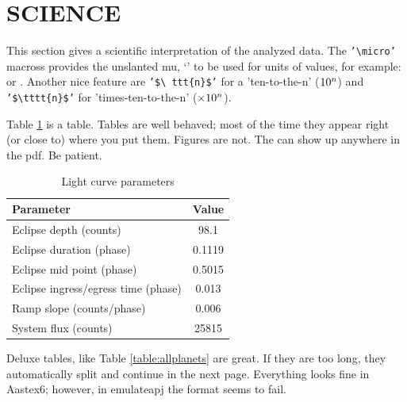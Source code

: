 \section{SCIENCE}
\label{sec:science}

This section gives a scientific interpretation of the analyzed data.
The \texttt{'\textbackslash micro'} macross provides the unslanted mu,
`{\micro}' to be used for units of values, for example: {\micron} or
{\microbar}.  Another nice feature are \texttt{'\$\textbackslash
  ttt\{n\}\$'} for a 'ten-to-the-n' ($\ttt{n}$) and
\texttt{'\$\textbackslash tttt\{n\}\$'} for 'times-ten-to-the-n'
($\tttt{n}$).

Table \ref{table:parameters} is a table.  Tables are well behaved;
most of the time they appear right (or close to) where you put them.
Figures are not.  The can show up anywhere in the pdf.   Be patient.

\begin{table}[ht]
\centering
\caption{\label{table:parameters} Light curve parameters}
\begin{tabular}{lc}
\hline
\hline
Parameter                           & Value           \\
\hline
Eclipse depth (counts)              & 98.1            \\
Eclipse duration (phase)            & 0.1119          \\
Eclipse mid point (phase)           & 0.5015          \\
Eclipse ingress/egress time (phase) & 0.013           \\
Ramp slope (counts/phase)           & 0.006           \\
System flux (counts)                & 25815           \\
\hline
\end{tabular}
\end{table}


Deluxe tables, like Table \ref{table:allplanets} are great. If they
are too long, they automatically split and continue in the next
page. Everything looks fine in Aastex6; however, in emulateapj the
format seems to fail.

